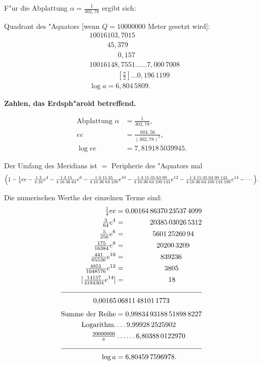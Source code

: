 \documentclass[12pt,a4paper]{article}
\theoremstyle{plain}
\theoremstyle{definition}
\theoremstyle{remark}
\begin{document}
F"ur die Abplattung $\alpha = \frac{1}{302{,}78}$ ergibt sich:

Quadrant des "Aquators [wenn $Q = 10000000$ Meter gesetzt wird]:
\begin{align*}
&10016103{,}7015\\
&\phantom{10016}45{,}379\\
&\phantom{10016103}0{,}157\\
&10016148{,}7551 \ldots\ldots 7{,}000\,7008\\
&\phantom{10016148}[\tfrac{\pi}{2}] \ldots 0{,}196\,1199\\
&\log a = 6{,}804\,5809.
\end{align*}

\textbf{Zahlen, das Erdsph"aroid betreffend.}

\begin{align*}
\text{Abplattung } \alpha &= \frac{1}{302{,}78}, \\
ee &= \frac{604{,}56}{(302{,}78)^2}, \\
\log ee &= 7{,}81918\,5039945.
\end{align*}

Der Umfang des Meridians ist $=$ Peripherie des "Aquators mal
\begin{multline*}
\Bigl(1 - \tfrac{1}{4}ee - \tfrac{1\cdot 3}{4\cdot 16}e^4 - \tfrac{1\cdot 3\cdot 15}{4\cdot 16\cdot 36\cdot 64}e^6 - \tfrac{1\cdot 3\cdot 15\cdot 35}{4\cdot 16\cdot 36\cdot 64\cdot 100}e^{10} - \tfrac{1\cdot 3\cdot 15\cdot 35\cdot 63\cdot 99}{4\cdot 16\cdot 36\cdot 64\cdot 100\cdot 144}e^{12} - \tfrac{1\cdot 3\cdot 15\cdot 35\cdot 63\cdot 99\cdot 143}{4\cdot 16\cdot 36\cdot 64\cdot 100\cdot 144\cdot 196}e^{14} - \cdots \Bigr).
\end{multline*}

Die numerischen Werthe der einzelnen Terme sind:
\begin{alignat*}{2}
\tfrac{1}{4}ee &= 0{,}00164\,86370\,23537\,4099 \\
\tfrac{3}{64}e^4 &= \phantom{0{,}00164}\,20385\,03026\,5312 \\
\tfrac{5}{256}e^6 &= \phantom{0{,}00164}\;\;5601\,25260\,94 \\
\tfrac{175}{16384}e^8 &= \phantom{0{,}00164}\;\;\;\;20200\,3209 \\
\tfrac{441}{65536}e^{10} &= \phantom{0{,}00164}\;\;\;\;\;\;839236 \\
\tfrac{4851}{1048576}e^{12} &= \phantom{0{,}00164}\;\;\;\;\;\;\;\;3805 \\
[\tfrac{14157}{4194304}e^{14}] &= \phantom{0{,}00164}\;\;\;\;\;\;\;\;\;\;18 \\
\cline{1-2}
\multicolumn{2}{c}{0{,}00165\,06811\,48101\,1773}\\[4pt]
\text{Summe der Reihe} &= 0{,}99834\,93188\,51898\,8227\\
\text{Logarithm.} &\ldots 9{,}99928\,2525902\\
\tfrac{20000000}{\pi} &\ldots\ldots 6{,}80388\,0122970\\
\cline{1-2}
\log a &= 6{,}80459\,7596978.
\end{alignat*}
\end{document}
